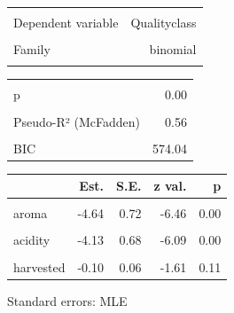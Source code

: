 \documentclass[
  letterpaper,
  DIV=11,
  numbers=noendperiod]{scrartcl}
\begin{document}
\begin{table}[!h]
\centering
\begin{tabular}{lr}
\toprule
\cellcolor{gray!10}{Observations} & \cellcolor{gray!10}{882}\\
Dependent variable & Qualityclass\\
\cellcolor{gray!10}{Type} & \cellcolor{gray!10}{Generalized linear model}\\
Family & binomial\\
\cellcolor{gray!10}{Link} & \cellcolor{gray!10}{logit}\\
\bottomrule
\end{tabular}
\end{table} \begin{table}[!h]
\centering
\begin{tabular}{lr}
\toprule
\cellcolor{gray!10}{$\chi^2$(5)} & \cellcolor{gray!10}{688.21}\\
p & 0.00\\
\cellcolor{gray!10}{Pseudo-R² (Cragg-Uhler)} & \cellcolor{gray!10}{0.72}\\
Pseudo-R² (McFadden) & 0.56\\
\cellcolor{gray!10}{AIC} & \cellcolor{gray!10}{545.34}\\
\addlinespace
BIC & 574.04\\
\bottomrule
\end{tabular}
\end{table} \begin{table}[!h]
\centering
\begin{threeparttable}
\begin{tabular}{lrrrr}
\toprule
  & Est. & S.E. & z val. & p\\
\midrule
\cellcolor{gray!10}{(Intercept)} & \cellcolor{gray!10}{313.21} & \cellcolor{gray!10}{120.41} & \cellcolor{gray!10}{2.60} & \cellcolor{gray!10}{0.01}\\
aroma & -4.64 & 0.72 & -6.46 & 0.00\\
\cellcolor{gray!10}{flavor} & \cellcolor{gray!10}{-7.09} & \cellcolor{gray!10}{0.87} & \cellcolor{gray!10}{-8.17} & \cellcolor{gray!10}{0.00}\\
acidity & -4.13 & 0.68 & -6.09 & 0.00\\
\cellcolor{gray!10}{altitude\_mean\_meters} & \cellcolor{gray!10}{-0.00} & \cellcolor{gray!10}{0.00} & \cellcolor{gray!10}{-3.14} & \cellcolor{gray!10}{0.00}\\
\addlinespace
harvested & -0.10 & 0.06 & -1.61 & 0.11\\
\bottomrule
\end{tabular}
\begin{tablenotes}
\item Standard errors: MLE
\end{tablenotes}
\end{threeparttable}
\end{table}
\end{document}
